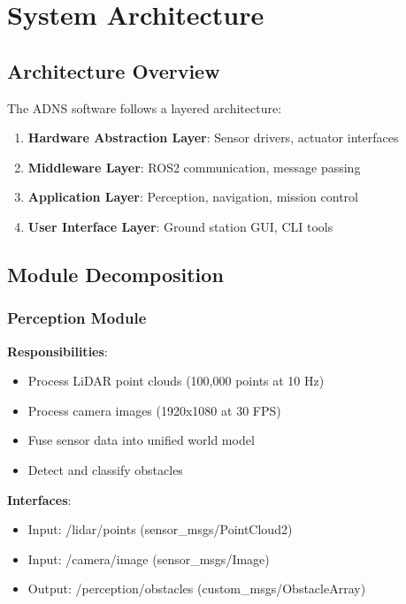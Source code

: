 \documentclass[11pt,a4paper]{article}
\begin{document}
\section{System Architecture}

\subsection{Architecture Overview}

The ADNS software follows a layered architecture:

\begin{enumerate}
    \item \textbf{Hardware Abstraction Layer}: Sensor drivers, actuator interfaces
    \item \textbf{Middleware Layer}: ROS2 communication, message passing
    \item \textbf{Application Layer}: Perception, navigation, mission control
    \item \textbf{User Interface Layer}: Ground station GUI, CLI tools
\end{enumerate}

\subsection{Module Decomposition}

\subsubsection{Perception Module}

\textbf{Responsibilities}:
\begin{itemize}
    \item Process LiDAR point clouds (100,000 points at 10 Hz)
    \item Process camera images (1920x1080 at 30 FPS)
    \item Fuse sensor data into unified world model
    \item Detect and classify obstacles
\end{itemize}

\textbf{Interfaces}:
\begin{itemize}
    \item Input: /lidar/points (sensor\_msgs/PointCloud2)
    \item Input: /camera/image (sensor\_msgs/Image)
    \item Output: /perception/obstacles (custom\_msgs/ObstacleArray)
\end{itemize}
\end{document}
